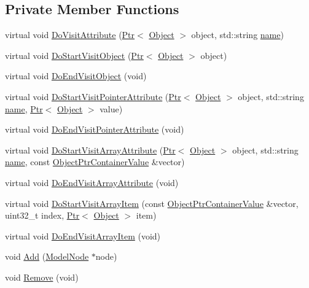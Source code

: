 \subsection*{Private Member Functions}
\begin{DoxyCompactItemize}
\item 
virtual void \hyperlink{classns3_1_1ModelCreator_a6ed6b80280b8cd9b28c65da331897067}{Do\+Visit\+Attribute} (\hyperlink{classns3_1_1Ptr}{Ptr}$<$ \hyperlink{classns3_1_1Object}{Object} $>$ object, std\+::string \hyperlink{generate__test__data__lte__spectrum__model_8m_ab74e6bf80237ddc4109968cedc58c151}{name})
\item 
virtual void \hyperlink{classns3_1_1ModelCreator_a75915887f99a7ab3cfcb03d8325a19b5}{Do\+Start\+Visit\+Object} (\hyperlink{classns3_1_1Ptr}{Ptr}$<$ \hyperlink{classns3_1_1Object}{Object} $>$ object)
\item 
virtual void \hyperlink{classns3_1_1ModelCreator_a790dae9bcc1caf28025b75842be1baef}{Do\+End\+Visit\+Object} (void)
\item 
virtual void \hyperlink{classns3_1_1ModelCreator_ad026ae7e57254d18e025290749e9f493}{Do\+Start\+Visit\+Pointer\+Attribute} (\hyperlink{classns3_1_1Ptr}{Ptr}$<$ \hyperlink{classns3_1_1Object}{Object} $>$ object, std\+::string \hyperlink{generate__test__data__lte__spectrum__model_8m_ab74e6bf80237ddc4109968cedc58c151}{name}, \hyperlink{classns3_1_1Ptr}{Ptr}$<$ \hyperlink{classns3_1_1Object}{Object} $>$ value)
\item 
virtual void \hyperlink{classns3_1_1ModelCreator_a4a7307c99434bc87c9abeff41e586232}{Do\+End\+Visit\+Pointer\+Attribute} (void)
\item 
virtual void \hyperlink{classns3_1_1ModelCreator_a5d15acc1df5727107e48ab07ae402aae}{Do\+Start\+Visit\+Array\+Attribute} (\hyperlink{classns3_1_1Ptr}{Ptr}$<$ \hyperlink{classns3_1_1Object}{Object} $>$ object, std\+::string \hyperlink{generate__test__data__lte__spectrum__model_8m_ab74e6bf80237ddc4109968cedc58c151}{name}, const \hyperlink{classns3_1_1ObjectPtrContainerValue}{Object\+Ptr\+Container\+Value} \&vector)
\item 
virtual void \hyperlink{classns3_1_1ModelCreator_a5f3cf3fc9d4581821e88dd3d0afa0d4d}{Do\+End\+Visit\+Array\+Attribute} (void)
\item 
virtual void \hyperlink{classns3_1_1ModelCreator_a1b328f74608146b38c502aee0eb139f4}{Do\+Start\+Visit\+Array\+Item} (const \hyperlink{classns3_1_1ObjectPtrContainerValue}{Object\+Ptr\+Container\+Value} \&vector, uint32\+\_\+t index, \hyperlink{classns3_1_1Ptr}{Ptr}$<$ \hyperlink{classns3_1_1Object}{Object} $>$ item)
\item 
virtual void \hyperlink{classns3_1_1ModelCreator_a39ec162d0ce3e1b00da9793661d6e873}{Do\+End\+Visit\+Array\+Item} (void)
\item 
void \hyperlink{classns3_1_1ModelCreator_a89400a73b9d74c00430699b66f246f60}{Add} (\hyperlink{structns3_1_1ModelNode}{Model\+Node} $\ast$node)
\item 
void \hyperlink{classns3_1_1ModelCreator_a477935d959f801e57a58e0e2f773932d}{Remove} (void)
\end{DoxyCompactItemize}
